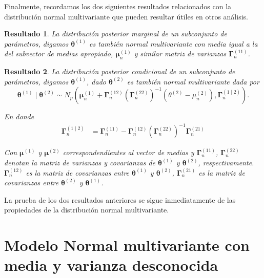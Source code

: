 \documentclass[
  10pt,
  spanish,
]{book}
\newtheorem{proposition}{Resultado}[chapter]
\theoremstyle{definition}
\theoremstyle{definition}
\theoremstyle{definition}
\theoremstyle{definition}
\theoremstyle{remark}
\begin{document}
Finalmente, recordamos los dos siguientes resultados relacionados con la distribución normal multivariante que pueden resultar útiles en otros análisis.

\begin{proposition}
\protect\hypertarget{prp:unnamed-chunk-33}{}{\label{prp:unnamed-chunk-33} }La distribución posterior marginal de un subconjunto de parámetros, digamos \(\boldsymbol \theta^{(1)}\) es también normal multivariante con media igual a la del subvector de medias apropiado, \(\boldsymbol \mu_n^{(1)}\) y similar matriz de varianzas \(\boldsymbol \Gamma_n^{(11)}\).
\end{proposition}

\begin{proposition}
\protect\hypertarget{prp:unnamed-chunk-34}{}{\label{prp:unnamed-chunk-34} }La distribución posterior condicional de un subconjunto de parámetros, digamos \(\boldsymbol \theta^{(1)}\), dado \(\boldsymbol \theta^{(2)}\) es también normal multivariante dada por
\begin{equation*}
  \boldsymbol \theta^{(1)} \mid \boldsymbol \theta^{(2)} \sim N_p \left(\boldsymbol \mu_n^{(1)}+\boldsymbol \Gamma_n^{(12)}\left(\boldsymbol \Gamma_n^{(22)}\right)^{-1}
  \left(\theta^{(2)}-\mu_n^{(2)}\right),\boldsymbol \Gamma_n^{(1 \mid 2)}\right).
\end{equation*}

En donde
\begin{align}
  \boldsymbol \Gamma_n^{(1 \mid 2)}&= \boldsymbol \Gamma_n^{(11)}-\boldsymbol \Gamma_n^{(12)}\left(\boldsymbol \Gamma_n^{(22)}\right)^{-1}\boldsymbol \Gamma_n^{(21)}
\end{align}

Con \(\boldsymbol \mu^{(1)}\) y \(\boldsymbol \mu^{(2)}\) correspondendientes al vector de medias y \(\boldsymbol \Gamma_n^{(11)}\), \(\boldsymbol \Gamma_n^{(22)}\) denotan la matriz de varianzas y covarianzas de \(\boldsymbol \theta^{(1)}\) y \(\boldsymbol \theta^{(2)}\), respectivamente. \(\boldsymbol \Gamma_n^{(12)}\) es la matriz de covarianzas entre \(\boldsymbol \theta^{(1)}\) y \(\boldsymbol \theta^{(2)}\), \(\boldsymbol \Gamma_n^{(21)}\) es la matriz de covarianzas entre \(\boldsymbol \theta^{(2)}\) y \(\boldsymbol \theta^{(1)}\).
\end{proposition}

La prueba de los dos resultados anteriores se sigue inmediatamente de las propiedades de la distribución normal multivariante.

\hypertarget{modelo-normal-multivariante-con-media-y-varianza-desconocida}{%
\section{Modelo Normal multivariante con media y varianza desconocida}\label{modelo-normal-multivariante-con-media-y-varianza-desconocida}}
\end{document}
